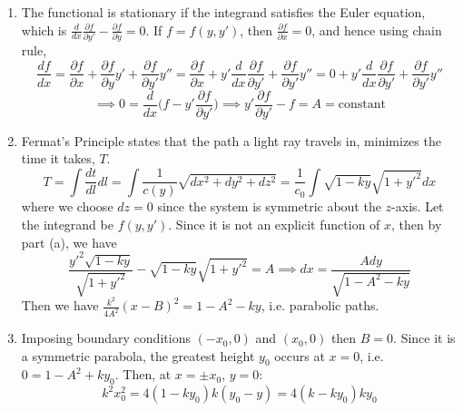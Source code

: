 \documentclass[a4paper]{article}
\begin{document}
\begin{ans}\leavevmode
\begin{enumerate}[label=(\alph*)]
\item The functional is stationary if the integrand satisfies the Euler equation, which is $\frac{d}{dx}\frac{\partial f}{\partial y'}-\frac{\partial f}{\partial y}=0$. If  $f=f(y,y')$, then $\frac{\partial f}{\partial x}=0$, and hence using chain rule,
$$\frac{df}{dx}=\frac{\partial f}{\partial x}+\frac{\partial f}{\partial y}y'+\frac{\partial f}{\partial y'}y''=\frac{\partial f}{\partial x}+y'\frac{d}{dx}\frac{\partial f}{\partial y'}+\frac{\partial f}{\partial y'}y''=0+y'\frac{d}{dx}\frac{\partial f}{\partial y'}+\frac{\partial f}{\partial y'}y''$$
$$\implies 0=\frac{d}{dx}\bigg(f-y'\frac{\partial f}{\partial y'}\bigg)\implies y'\frac{\partial f}{\partial y'}-f=A=\text{constant}$$
\item Fermat's Principle states that the path a light ray travels in, minimizes the time it takes, $T$.
$$T=\int\frac{dt}{dl}dl=\int\frac{1}{c(y)}\sqrt{dx^2+dy^2+dz^2}=\frac{1}{c_0}\int\sqrt{1-ky}\sqrt{1+y'^2}dx$$
where we choose $dz=0$ since the system is symmetric about the $z$-axis. Let the integrand be $f(y,y')$. Since it is not an explicit function of $x$, then by part (a), we have
$$\frac{y'^2\sqrt{1-ky}}{\sqrt{1+y'^2}}-\sqrt{1-ky}\sqrt{1+y'^2}=A\implies dx=\frac{Ady}{\sqrt{1-A^2-ky}}$$
Then we have $\frac{k^2}{4A^2}(x-B)^2=1-A^2-ky$, i.e. parabolic paths.
\item Imposing boundary conditions $(-x_0,0)$ and $(x_0,0)$ then $B=0$. Since it is a symmetric parabola, the greatest height $y_0$ occurs at $x=0$, i.e. $0=1-A^2+ky_0$. Then, at $x=\pm x_0$, $y=0$:
$$k^2x_0^2=4(1-ky_0)k(y_0-y)=4(k-ky_0)ky_0$$
\end{enumerate}
\end{ans}
\newpage
\end{document}

